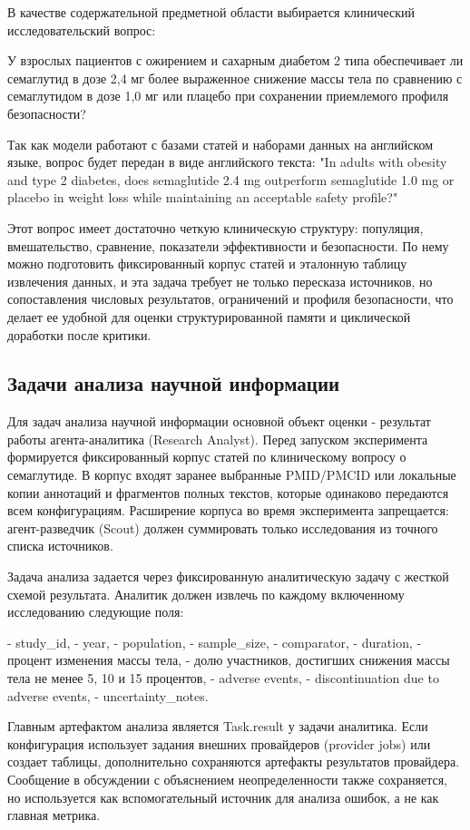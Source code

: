 В качестве содержательной предметной области выбирается клинический исследовательский вопрос:

У взрослых пациентов с ожирением и сахарным диабетом 2 типа обеспечивает ли семаглутид в дозе 2,4 мг более выраженное снижение массы тела по сравнению с семаглутидом в дозе 1,0 мг или плацебо при сохранении приемлемого профиля безопасности?

Так как модели работают с базами статей и наборами данных на английском языке, вопрос будет передан в виде английского текста:
"In adults with obesity and type 2 diabetes, does semaglutide 2.4 mg outperform semaglutide 1.0 mg or placebo in weight loss while maintaining an acceptable safety profile?"

Этот вопрос имеет достаточно четкую клиническую структуру: популяция, вмешательство, сравнение, показатели эффективности и безопасности. По нему можно подготовить фиксированный корпус статей и эталонную таблицу извлечения данных, и эта задача требует не только пересказа источников, но сопоставления числовых результатов, ограничений и профиля безопасности, что делает ее удобной для оценки структурированной памяти и циклической доработки после критики.


\subsection{Задачи анализа научной информации}

Для задач анализа научной информации основной объект оценки - результат работы агента-аналитика (Research Analyst). Перед запуском эксперимента формируется фиксированный корпус статей по клиническому вопросу о семаглутиде. В корпус входят заранее выбранные PMID/PMCID или локальные копии аннотаций и фрагментов полных текстов, которые одинаково передаются всем конфигурациям. Расширение корпуса во время эксперимента запрещается: агент-разведчик (Scout) должен суммировать только исследования из точного списка источников.

Задача анализа задается через фиксированную аналитическую задачу с жесткой схемой результата. Аналитик должен извлечь по каждому включенному исследованию следующие поля:

- study_id,
- year,
- population,
- sample_size,
- comparator,
- duration,
- процент изменения массы тела,
- долю участников, достигших снижения массы тела не менее 5, 10 и 15 процентов,
- adverse events,
- discontinuation due to adverse events,
- uncertainty_notes.

Главным артефактом анализа является Task.result у задачи аналитика. Если конфигурация использует задания внешних провайдеров (provider jobs) или создает таблицы, дополнительно сохраняются артефакты результатов провайдера. Сообщение в обсуждении с объяснением неопределенности также сохраняется, но используется как вспомогательный источник для анализа ошибок, а не как главная метрика.

